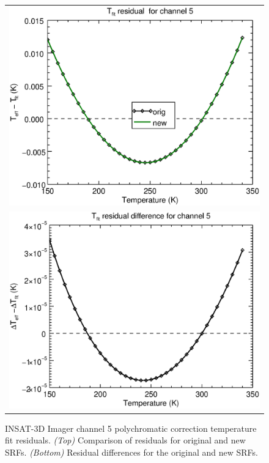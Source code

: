 \begin{figure}[H]
  \centering
  \begin{tabular}{c}
    \includegraphics[scale=0.55]{graphics/imgr/tfit/imgr_insat3d-5.tfit.eps} \\
    \includegraphics[scale=0.55]{graphics/imgr/tfit/imgr_insat3d-5.tfit.difference.eps}
  \end{tabular}
  \caption{INSAT-3D Imager channel 5 polychromatic correction temperature fit residuals. \emph{(Top)} Comparison of residuals for original and new SRFs. \emph{(Bottom)} Residual differences for the original and new SRFs.}
  \label{fig:imgr_ch5_tfit}
\end{figure}


